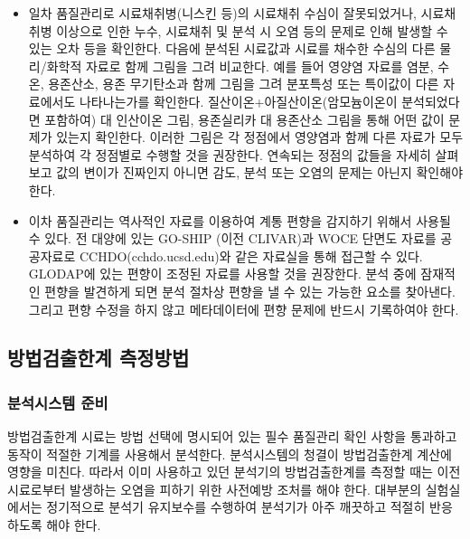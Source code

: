\documentclass[
]{book}
\begin{document}
\begin{itemize}
\item
  일차 품질관리로 시료채취병(니스킨 등)의 시료채취 수심이 잘못되었거나, 시료채취병 이상으로 인한 누수, 시료채취 및 분석 시 오염 등의 문제로 인해 발생할 수 있는 오차 등을 확인한다. 다음에 분석된 시료값과 시료를 채수한 수심의 다른 물리/화학적 자료로 함께 그림을 그려 비교한다. 예를 들어 영양염 자료를 염분, 수온, 용존산소, 용존 무기탄소과 함께 그림을 그려 분포특성 또는 특이값이 다른 자료에서도 나타나는가를 확인한다. 질산이온+아질산이온(암모늄이온이 분석되었다면 포함하여) 대 인산이온 그림, 용존실리카 대 용존산소 그림을 통해 어떤 값이 문제가 있는지 확인한다. 이러한 그림은 각 정점에서 영양염과 함께 다른 자료가 모두 분석하여 각 정점별로 수행할 것을 권장한다. 연속되는 정점의 값들을 자세히 살펴보고 값의 변이가 진짜인지 아니면 감도, 분석 또는 오염의 문제는 아닌지 확인해야한다.
\item
  이차 품질관리는 역사적인 자료를 이용하여 계통 편향을 감지하기 위해서 사용될 수 있다. 전 대양에 있는 GO-SHIP (이전 CLIVAR)과 WOCE 단면도 자료를 공공자료로 CCHDO(cchdo.ucsd.edu)와 같은 자료실을 통해 접근할 수 있다. GLODAP에 있는 편향이 조정된 자료를 사용할 것을 권장한다. 분석 중에 잠재적인 편향을 발견하게 되면 분석 절차상 편향을 낼 수 있는 가능한 요소를 찾아낸다. 그리고 편향 수정을 하지 않고 메타데이터에 편향 문제에 반드시 기록하여야 한다.
\end{itemize}

\hypertarget{uxbc29uxbc95uxac80uxcd9cuxd55cuxacc4-uxce21uxc815uxbc29uxbc95}{%
\subsection{방법검출한계 측정방법}\label{uxbc29uxbc95uxac80uxcd9cuxd55cuxacc4-uxce21uxc815uxbc29uxbc95}}

\hypertarget{uxbd84uxc11duxc2dcuxc2a4uxd15c-uxc900uxbe44}{%
\subsubsection{분석시스템 준비}\label{uxbd84uxc11duxc2dcuxc2a4uxd15c-uxc900uxbe44}}

방법검출한계 시료는 방법 선택에 명시되어 있는 필수 품질관리 확인 사항을 통과하고 동작이 적절한 기계를 사용해서 분석한다. 분석시스템의 청결이 방법검출한계 계산에 영향을 미친다. 따라서 이미 사용하고 있던 분석기의 방법검출한계를 측정할 때는 이전 시료로부터 발생하는 오염을 피하기 위한 사전예방 조처를 해야 한다. 대부분의 실험실에서는 정기적으로 분석기 유지보수를 수행하여 분석기가 아주 깨끗하고 적절히 반응하도록 해야 한다.
\end{document}
